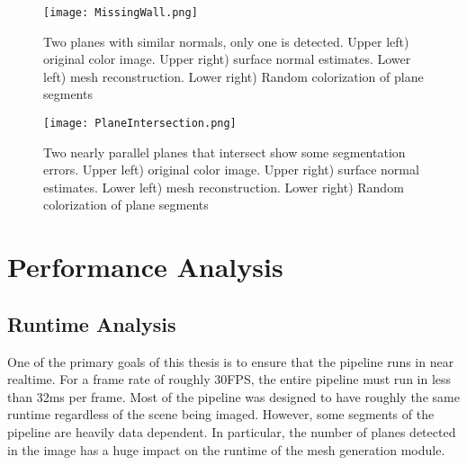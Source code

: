 \begin{figure}[!htpb]
    \centering
    \texttt{[image: MissingWall.png]}
    \caption{Two planes with similar normals, only one is detected. Upper left) original color image. Upper right) surface normal estimates. Lower left) mesh reconstruction. Lower right) Random colorization of plane segments}
    \label{fig:missingwall}
\end{figure}



\begin{figure}[!htpb]
    \centering
    \texttt{[image: PlaneIntersection.png]}
    \caption{Two nearly parallel planes that intersect show some segmentation errors. Upper left) original color image. Upper right) surface normal estimates. Lower left) mesh reconstruction. Lower right) Random colorization of plane segments}
    \label{fig:planeintersect}
\end{figure}



\section{Performance Analysis}
\subsection{Runtime Analysis}
One of the primary goals of this thesis is to ensure that the pipeline runs in near realtime. For a frame rate of roughly 30FPS, the entire pipeline must run in less than 32ms per frame. Most of the pipeline was designed to  have roughly the same runtime regardless of the scene being imaged. However, some segments of the pipeline are heavily data dependent. In particular, the number of planes detected in the image has a huge impact on the runtime of the mesh generation module.\par 

